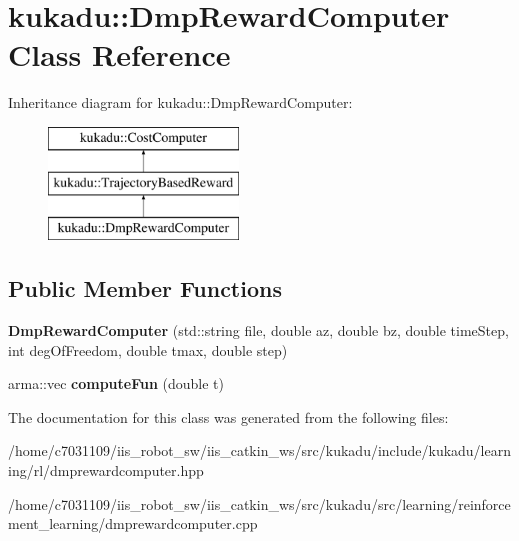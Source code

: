 \hypertarget{classkukadu_1_1DmpRewardComputer}{\section{kukadu\-:\-:Dmp\-Reward\-Computer Class Reference}
\label{classkukadu_1_1DmpRewardComputer}
}
Inheritance diagram for kukadu\-:\-:Dmp\-Reward\-Computer\-:\begin{figure}[H]
\begin{center}
\leavevmode
\includegraphics[height=3.000000cm]{classkukadu_1_1DmpRewardComputer}
\end{center}
\end{figure}
\subsection*{Public Member Functions}
\begin{DoxyCompactItemize}
\item 
\hypertarget{classkukadu_1_1DmpRewardComputer_ac7250816fcccadabc1cab8a8ea051651}{{\bfseries Dmp\-Reward\-Computer} (std\-::string file, double az, double bz, double time\-Step, int deg\-Of\-Freedom, double tmax, double step)}\label{classkukadu_1_1DmpRewardComputer_ac7250816fcccadabc1cab8a8ea051651}

\item 
\hypertarget{classkukadu_1_1DmpRewardComputer_aef2a5a9a1703bd183e09eac8becba726}{arma\-::vec {\bfseries compute\-Fun} (double t)}\label{classkukadu_1_1DmpRewardComputer_aef2a5a9a1703bd183e09eac8becba726}

\end{DoxyCompactItemize}


The documentation for this class was generated from the following files\-:\begin{DoxyCompactItemize}
\item 
/home/c7031109/iis\-\_\-robot\-\_\-sw/iis\-\_\-catkin\-\_\-ws/src/kukadu/include/kukadu/learning/rl/dmprewardcomputer.\-hpp\item 
/home/c7031109/iis\-\_\-robot\-\_\-sw/iis\-\_\-catkin\-\_\-ws/src/kukadu/src/learning/reinforcement\-\_\-learning/dmprewardcomputer.\-cpp\end{DoxyCompactItemize}
